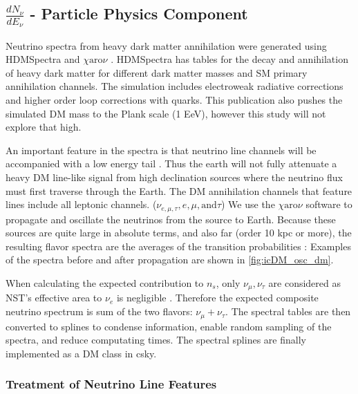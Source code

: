 \subsection{$\frac{dN_\nu}{dE_\nu}$ - Particle Physics Component}\label{sec:icDM_particlephysics}

Neutrino spectra from heavy dark matter annihilation were generated using HDMSpectra \cite{HDMSpectra} and $\chi \textrm{aro}\nu$ \cite{Charon}.
HDMSpectra has tables for the decay and annihilation of heavy dark matter for different dark matter masses and SM primary annihilation channels.
The simulation includes electroweak radiative corrections and higher order loop corrections with quarks.
This publication also pushes the simulated DM mass to the Plank scale (1 EeV), however this study will not explore that high.

An important feature in the spectra is that neutrino line channels will be accompanied with a low energy tail \cite{HDMSpectra}.
Thus the earth will not fully attenuate a heavy DM line-like signal from high declination sources where the neutrino flux must first traverse through the Earth.
The DM annihilation channels that feature lines include all leptonic channels. ($\nu_{e,\mu,\tau}, e, \mu, \mathrm{and} \tau$)
We use the \href{https://iopscience.iop.org/article/10.1088/1475-7516/2020/10/043}{ $\chi \mathrm{aro}\nu$} software to propagate and oscillate the neutrinos from the source to Earth.
Because these sources are quite large in absolute terms, and also far (order 10 kpc or more), the resulting flavor spectra are the averages of the transition probabilities \cite{Charon}:
\nuOscMatrix
Examples of the spectra before and after propagation are shown in \cref{fig:icDM_osc_dm}.

When calculating the expected contribution to $n_s$, only $ \nu_\mu, \nu_\tau $ are considered as NST's effective area to $ \nu_e $ is negligible \cite{IC3_thesis_Cerver}.
Therefore the expected composite neutrino spectrum is sum of the two flavors: $\nu_\mu + \nu_\tau$.
The spectral tables are then converted to splines to condense information, enable random sampling of the spectra, and reduce computating times.
The spectral splines are finally implemented as a DM class in csky.


\subsubsection{Treatment of Neutrino Line Features}\label{sec:icDM_nu_lines}

